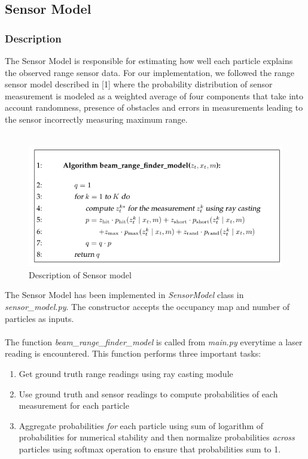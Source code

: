 \documentclass[12pt, a4paper]{article}
\begin{document}
\subsection{Sensor Model}
\subsubsection{Description}
The Sensor Model is responsible for estimating how well each particle explains the observed range sensor data. For our implementation, we followed the range sensor model described in [1] where the probability distribution of sensor measurement is modeled as a weighted average of four components that take into account randomness, presence of obstacles and errors in measurements leading to the sensor incorrectly measuring maximum range. \\\\
\begin{figure}[H]
  \centering
  \includegraphics[width=0.9\linewidth]{results/sensor_model_desc.png}
  \caption{Description of Sensor model}
\end{figure}
The Sensor Model has been implemented in \textit{SensorModel} class in \textit{sensor\_model.py}. The constructor accepts the occupancy map and number of particles as inputs.\\\\
The function \textit{beam\_range\_finder\_model} is called from \textit{main.py} everytime a laser reading is encountered. This function performs three important tasks:
\begin{enumerate}
  \item Get ground truth range readings using ray casting module
  \item Use ground truth and sensor readings to compute probabilities of each measurement for each particle
  \item Aggregate probabilities \textit{for} each particle using sum of logarithm of probabilities for numerical stability and then normalize probabilities \textit{across} particles using softmax operation to ensure that probabilities sum to 1.
\end{enumerate}
\end{document}
